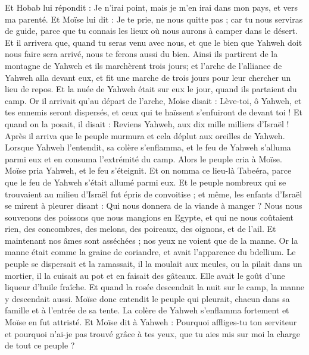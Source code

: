 \begin{multicols}{2}
Et Hobab lui répondit : Je n'irai point, mais je m'en irai dans mon pays, et vers ma parenté.
Et Moïse lui dit : Je te prie, ne nous quitte pas ; car tu nous serviras de guide, parce que tu connais les lieux où nous aurons à camper dans le désert.
Et il arrivera que, quand tu seras venu avec nous, et que le bien que Yahweh doit nous faire sera arrivé, nous te ferons aussi du bien.
Ainsi ils partirent de la montagne de Yahweh et ils marchèrent trois jours; et l'arche de l'alliance de Yahweh alla devant eux, et fit une marche de trois jours pour leur chercher un lieu de repos.
Et la nuée de Yahweh était sur eux le jour, quand ils partaient du camp.
Or il arrivait qu'au départ de l'arche, Moïse disait : Lève-toi, ô Yahweh, et tes ennemis seront dispersés, et ceux qui te haïssent s'enfuiront de devant toi !
Et quand on la posait, il disait : Reviens Yahweh, aux dix mille milliers d'Israël !
\VerseOne{}Après il arriva que le peuple murmura et cela déplut aux oreilles de Yahweh. Lorsque Yahweh l'entendit, sa colère s'enflamma, et le feu de Yahweh s'alluma parmi eux et en consuma l'extrémité du camp.
Alors le peuple cria à Moïse. Moïse pria Yahweh, et le feu s'éteignit.
Et on nomma ce lieu-là Tabeéra, parce que le feu de Yahweh s'était allumé parmi eux.
Et le peuple nombreux qui se trouvaient au milieu d'Israël fut épris de convoitise ; et même, les enfants d'Israël se mirent à pleurer disant : Qui nous donnera de la viande à manger ?
Nous nous souvenons des poissons que nous mangions en Egypte, et qui ne nous coûtaient rien, des concombres, des melons, des poireaux, des oignons, et de l'ail.
Et maintenant nos âmes sont asséchées ; nos yeux ne voient que de la manne.
Or la manne était comme la graine de coriandre, et avait l'apparence du bdellium.
Le peuple se dispersait et la ramassait, il la moulait aux meules, ou la pilait dans un mortier, il la cuisait au pot et en faisait des gâteaux. Elle avait le goût d'une liqueur d'huile fraîche.
Et quand la rosée descendait la nuit sur le camp, la manne y descendait aussi.
Moïse donc entendit le peuple qui pleurait, chacun dans sa famille et à l'entrée de sa tente. La colère de Yahweh s'enflamma fortement et Moïse en fut attristé.
Et Moïse dit à Yahweh : Pourquoi affliges-tu ton serviteur et pourquoi n'ai-je pas trouvé grâce à tes yeux, que tu aies mis sur moi la charge de tout ce peuple ?

\end{multicols}
